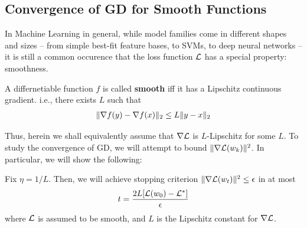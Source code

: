         
\subsection{Convergence of GD for Smooth Functions}
In Machine Learning in general, while model families come in different shapes and sizes -- from simple best-fit feature bases, to SVMs, to deep neural networks -- it is still a common occurence that the loss function $\mathcal{L}$ has a special property: smoothness.
\begin{defn}
A differnetiable function $f$ is called \textbf{smooth} iff it has a Lipschitz continuous gradient. i.e., there exists $L$ such that
\begin{align*}
    \lVert \nabla f(y) - \nabla f(x) \rVert_2 \leq L \lVert y - x \rVert_2
\end{align*}
\end{defn}
Thus, herein we shall equivalently assume that $\nabla \mathcal{L}$ is $L$-Lipschitz for some $L$. To study the convergence of GD, we will attempt to bound $\lVert \nabla \mathcal{L}(w_k) \rVert^2$. In particular, we will show the following:
\begin{mdframed}
\begin{theorem}
Fix $\eta = 1/L$. Then, we will achieve stopping criterion $\lVert \nabla \mathcal{L}(w_t) \rVert^2 \leq \epsilon$ in at most
\begin{align*}
    t = \frac{2L[\mathcal{L}(w_0) - \mathcal{L}^*]}{\epsilon}
\end{align*}
where $\mathcal{L}$ is assumed to be smooth, and $L$ is the Lipschitz constant for $\nabla \mathcal{L}$.
\end{theorem}
\end{mdframed}

